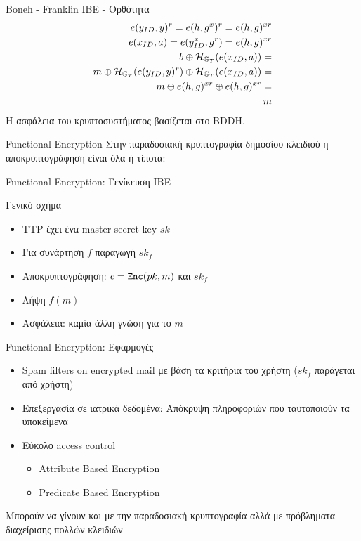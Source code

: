 \documentclass[handout]{beamer}
\begin{document}
\begin{frame}{Boneh - Franklin IBE - Ορθότητα}
	\begin{align*} 
		e(y_{ID},y)^r = e(h,g^x)^r =  e(h,g)^{xr} \\
		e(x_{ID},a) = e(y_{ID}^x,g^r) = e(h,g)^{xr} \\
		b \oplus \mathcal{H}_{\mathbb{G}_T}(e(x_{ID},a)) = \\
		m \oplus \mathcal{H}_{\mathbb{G}_T}(e(y_{ID},y)^r) \oplus \mathcal{H}_{\mathbb{G}_T}(e(x_{ID},a)) = \\
		m \oplus e(h,g)^{xr} \oplus e(h,g)^{xr} = \\
		m
	\end{align*}
	Η ασφάλεια του κρυπτοσυστήματος βασίζεται στο \gls{BDDH}. 
\end{frame}

\begin{frame}{Functional Encryption}
	Στην παραδοσιακή κρυπτογραφία δημοσίου κλειδιού η αποκρυπτογράφηση είναι όλα ή τίποτα:

	Functional Encryption: Γενίκευση IBE \pause

\begin{block}{Γενικό σχήμα}
	\begin{itemize}
		\item TTP έχει ένα master secret key $sk$ \pause
		\item Για συνάρτηση $f$ παραγωγή $sk_f$ \pause
		\item Αποκρυπτογράφηση: $c = \mathtt{Enc}(pk,m)$ και $sk_f$ \pause
		\item Λήψη $f(m)$ 
		\item Ασφάλεια: καμία άλλη γνώση για το $m$
	\end{itemize}
\end{block}
\end{frame}

\begin{frame}{Functional Encryption: Εφαρμογές}
	\begin{itemize}
		\item Spam filters on encrypted mail με βάση τα κριτήρια του χρήστη ($sk_f$ παράγεται από χρήστη)
		\item Επεξεργασία σε ιατρικά δεδομένα: Απόκρυψη πληροφοριών που ταυτοποιούν τα υποκείμενα
		\item Εύκολο access control
		\begin{itemize}
			\item Attribute Based Encryption
			\item Predicate Based Encryption
		\end{itemize}
	\end{itemize}
	Μπορούν να γίνουν και με την παραδοσιακή κρυπτογραφία αλλά με πρόβληματα διαχείρισης πολλών κλειδιών
\end{frame} 
\end{document}
